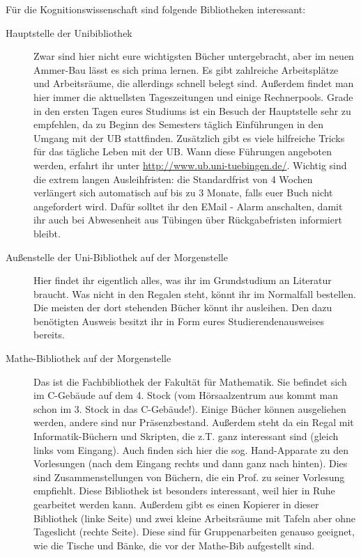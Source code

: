 
Für die Kognitionswissenschaft sind folgende Bibliotheken interessant:
\begin{description}
	\item[Hauptstelle der Unibibliothek] Zwar sind hier nicht eure wichtigsten
	Bücher untergebracht, aber im neuen Ammer-Bau lässt es sich prima
	lernen. Es gibt zahlreiche Arbeitsplätze und Arbeitsräume, die
	allerdings schnell belegt sind. Außerdem findet man hier immer die
	aktuellsten Tageszeitungen und einige Rechnerpools.
	Grade in den ersten Tagen eures Studiums ist ein Besuch der Hauptstelle
	sehr zu empfehlen, da zu Beginn des Semesters täglich Einführungen in den Umgang mit der UB stattfinden. Zusätzlich gibt es viele hilfreiche Tricks für das tägliche Leben mit der UB. Wann diese Führungen angeboten werden, erfahrt ihr unter  \url{http://www.ub.uni-tuebingen.de/}. Wichtig sind die extrem langen Ausleihfristen: die Standardfrist von 4 Wochen verlängert sich automatisch auf bis zu 3 Monate, falls euer Buch nicht angefordert wird. Dafür solltet ihr den EMail - Alarm anschalten, damit ihr auch bei Abwesenheit aus Tübingen über Rückgabefristen informiert bleibt. 
	
	\item[Außenstelle der Uni-Bibliothek auf der Morgenstelle]
	Hier findet ihr eigentlich alles, was ihr im Grundstudium an
	Literatur braucht.  Was nicht in den Regalen steht, könnt ihr
	im Normalfall bestellen.  Die meisten der dort stehenden Bücher könnt ihr
	ausleihen. Den dazu benötigten Ausweis besitzt ihr in Form eures Studierendenausweises bereits.
	
	\item[Mathe-Bibliothek auf der Morgenstelle]
	Das ist die Fachbibliothek der Fakultät für Mathematik. Sie
	befindet sich im C-Gebäude auf dem 4. Stock (vom
	Hörsaalzentrum aus kommt man schon im 3. Stock in das
	C-Gebäude!). Einige Bücher können ausgeliehen werden,
	andere sind nur Präsenzbestand.  Außerdem steht da ein Regal
	mit Informatik-Büchern und Skripten, die z.T. ganz
	interessant sind (gleich links vom Eingang).  Auch finden sich
	hier die sog. Hand-Apparate zu den Vorlesungen (nach dem
	Eingang rechts und dann ganz nach hinten).  Dies sind
	Zusammenstellungen von Büchern, die ein Prof. zu seiner
	Vorlesung empfiehlt.  Diese Bibliothek ist besonders
	interessant, weil hier in Ruhe gearbeitet werden kann.
	Außerdem gibt es einen Kopierer in dieser Bibliothek (linke
	Seite) und zwei kleine Arbeitsräume mit Tafeln aber ohne
	Tageslicht (rechte Seite).  Diese sind für Gruppenarbeiten
	genauso geeignet, wie die Tische und Bänke, die vor der
	Mathe-Bib aufgestellt sind.
	

\end{description}
